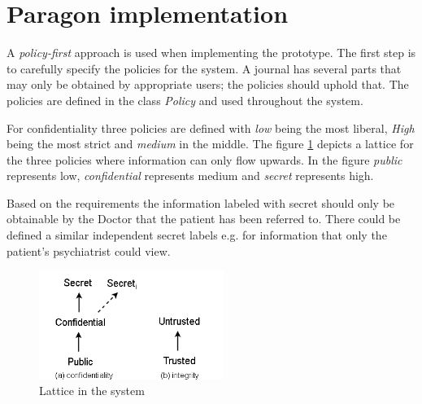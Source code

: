 





\section{Paragon implementation}

A \emph{policy-first} approach is used when implementing the prototype. The first step is to carefully specify the policies for the system. A journal has several parts that may only be obtained by appropriate users; the policies should uphold that. The policies are defined in the class \emph{Policy} and used throughout the system.

For confidentiality three policies are defined with \emph{low} being the most liberal, \emph{High} being the most strict and \emph{medium} in the middle. The figure \ref{fig:lattice_confidentiality} depicts a lattice for the three policies where information can only flow upwards. In the figure \emph{public} represents low, \emph{confidential} represents medium and \emph{secret} represents high. 

Based on the requirements the information labeled with secret should only be obtainable by the Doctor that the patient has been referred to. There could be defined a similar independent secret labels e.g. for information that only the patient's psychiatrist could view.  


\begin{figure}[H] 
	\centering
	\includegraphics[width=6cm]{figures/lattice_confidentiality.png}
	\caption{Lattice in the system}
	\label{fig:lattice_confidentiality}
\end{figure}

